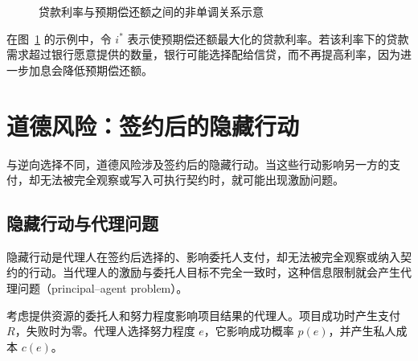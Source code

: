 \begin{figure}[H]
\centering


\caption{贷款利率与预期偿还额之间的非单调关系示意}

\label{fig:ch3-credit-rationing}
\end{figure}


在图~\ref{fig:ch3-credit-rationing} 的示例中，令 $i^*$ 表示使预期偿还额最大化的贷款利率。若该利率下的贷款需求超过银行愿意提供的数量，银行可能选择配给信贷，而不再提高利率，因为进一步加息会降低预期偿还额。


\section{道德风险：签约后的隐藏行动}

与逆向选择不同，道德风险涉及签约后的隐藏行动。当这些行动影响另一方的支付，却无法被完全观察或写入可执行契约时，就可能出现激励问题。

\subsection{隐藏行动与代理问题}

隐藏行动是代理人在签约后选择的、影响委托人支付，却无法被完全观察或纳入契约的行动。当代理人的激励与委托人目标不完全一致时，这种信息限制就会产生代理问题（principal--agent problem）。

考虑提供资源的委托人和努力程度影响项目结果的代理人。项目成功时产生支付 $R$，失败时为零。代理人选择努力程度 $e$，它影响成功概率 $p(e)$，并产生私人成本 $c(e)$。


